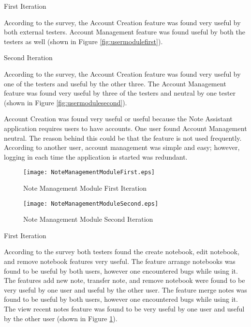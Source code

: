 \begin{flushleft}
First Iteration
\end{flushleft}

\begin{raggedright}
According to the survey, the Account Creation feature was found very useful by both external testers. Account Management feature was found useful by both the testers as well (shown in Figure \ref{fig:usermodulefirst}). 
\end{raggedright}

\begin{flushleft}
Second Iteration
\end{flushleft}

\begin{raggedright}
According to the survey, the Account Creation feature was found very useful by one of the testers and useful by the other three. The Account Management feature was found very useful by three of the testers and neutral by one tester (shown in Figure \ref{fig:usermodulesecond}).
\end{raggedright} 

Account Creation was found very useful or useful because the Note Assistant application requires users to have accounts. One user found Account Management neutral. The reason behind this could be that the feature is not used frequently. According to another user, account management was simple and easy; however, logging in each time the application is started was redundant.

\begin{figure}[htbp!]
   \centering
   \texttt{[image: NoteManagementModuleFirst.eps]} 
   \caption{Note Management Module First Iteration}
   \label{fig:notemanagementmodulefirst}
\end{figure}

\pagebreak
\begin{figure}[htbp!]
   \centering
   \texttt{[image: NoteManagementModuleSecond.eps]} 
   \caption{Note Management Module Second Iteration}
   \label{fig:notemanagementmodulesecond}
\end{figure}

\begin{flushleft}
First Iteration
\end{flushleft}
 
\begin{raggedright}
According to the survey both testers found the create notebook, edit notebook, and remove notebook features very useful. The feature arrange notebooks was found to be useful by both users, however one encountered bugs while using it. The features add new note, transfer note, and remove notebook were found to be very useful by one user and useful by the other user. The feature merge notes was found to be useful by both users, however one encountered bugs while using it. The view recent notes feature was found to be very useful by one user and useful by the other user (shown in Figure \ref{fig:notemanagementmodulefirst}).
\end{raggedright}

